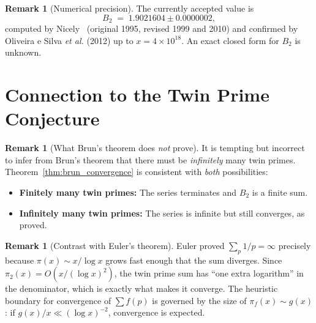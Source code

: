 \documentclass[12pt,a4paper]{amsart}
\theoremstyle{definition}
\newtheorem{remark}[theorem]{Remark}
\begin{document}
\begin{remark}[Numerical precision]
  The currently accepted value is
  \[
    B_2 \;=\; 1.9021604 \pm 0.0000002,
  \]
  computed by Nicely~\cite{Nicely1995} (original 1995, revised 1999 and 2010)
  and confirmed by Oliveira e Silva \emph{et al.} (2012) up to $x = 4 \times 10^{18}$.
  An exact closed form for $B_2$ is unknown.
\end{remark}

\section{Connection to the Twin Prime Conjecture}
\label{sec:conjecture}

\begin{remark}[What Brun's theorem does \emph{not} prove]
  It is tempting but incorrect to infer from Brun's theorem that there
  must be \emph{infinitely} many twin primes.  Theorem~\ref{thm:brun_convergence}
  is consistent with \emph{both} possibilities:
  \begin{itemize}
    \item \textbf{Finitely many twin primes:} The series terminates and
      $B_2$ is a finite sum.
    \item \textbf{Infinitely many twin primes:} The series is infinite
      but still converges, as proved.
  \end{itemize}
\end{remark}

\begin{remark}[Contrast with Euler's theorem]
  Euler proved $\sum_p 1/p = \infty$ precisely because $\pi(x) \sim x/\log x$
  grows fast enough that the sum diverges.  Since $\pi_2(x) = O(x/(\log x)^2)$,
  the twin prime sum has ``one extra logarithm'' in the denominator, which is
  exactly what makes it converge.  The heuristic boundary for convergence of
  $\sum f(p)$ is governed by the size of $\pi_f(x) \sim g(x)$: if
  $g(x)/x \ll (\log x)^{-2}$, convergence is expected.
\end{remark}
\end{document}
